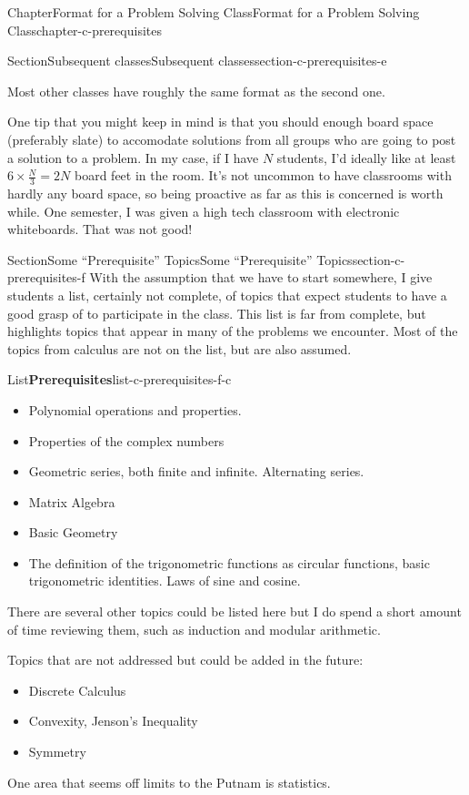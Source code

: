 \documentclass[oneside,10pt,]{book}
\numberwithin{equation}{section}
\begin{document}
\begin{chapterptx}{Chapter}{Format for a Problem Solving Class}{}{Format for a Problem Solving Class}{}{}{chapter-c-prerequisites}
\begin{sectionptx}{Section}{Subsequent classes}{}{Subsequent classes}{}{}{section-c-prerequisites-e}
\par
Most other classes have roughly the same format as the second one.%
\par
One tip that you might keep in mind is that you should enough board space (preferably slate) to accomodate solutions from all groups who are going to post a solution to a problem.   In my case, if I have \(N\) students, I'd ideally like at least \(6 \times \frac{N}{3} = 2 N\) board feet in the room.  It's not uncommon to have classrooms with hardly any board space, so being proactive as far as this is concerned is worth while.  One semester, I was given a high tech classroom with electronic whiteboards.  That was not good!%
\end{sectionptx}
%
%
\typeout{************************************************}
\typeout{************************************************}
%
\begin{sectionptx}{Section}{Some ``Prerequisite'' Topics}{}{Some ``Prerequisite'' Topics}{}{}{section-c-prerequisites-f}
With the assumption that we have to start somewhere, I give students a list, certainly not complete, of topics that expect students to have a good grasp of to participate in the class.  This list is far from complete, but highlights topics that appear in many of the problems we encounter. Most of the topics from calculus are not on the list, but are also assumed.%
\begin{listptx}{List}{\textbf{Prerequisites}}{list-c-prerequisites-f-c}{}%
%
\begin{itemize}[label=\textbullet]
\item{}Polynomial operations and properties.%
\item{}Properties of the complex numbers%
\item{}Geometric series, both finite and infinite.  Alternating series.%
\item{}Matrix Algebra%
\item{}Basic Geometry%
\item{}The definition of the trigonometric functions as circular functions, basic trigonometric identities.  Laws of sine and cosine.%
\end{itemize}
There are several other topics could be listed here but I do spend a short amount of time reviewing them, such as induction and modular arithmetic.%
\par
Topics that are not addressed but could be added in the future:%
\begin{itemize}[label=\textbullet]
\item{}Discrete Calculus%
\item{}Convexity, Jenson's Inequality%
\item{}Symmetry%
\end{itemize}
One area that seems off limits to the Putnam is statistics.%
\end{listptx}%
\end{sectionptx}
\end{chapterptx}
\end{document}
